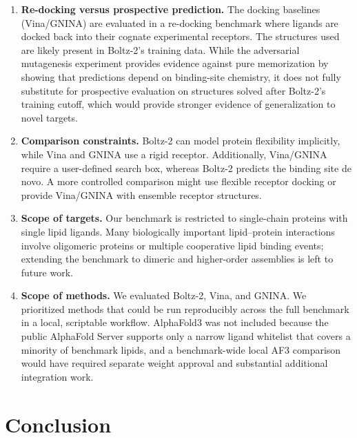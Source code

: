 \documentclass[journal=jcisd8,manuscript=article]{achemso}
\begin{document}
\begin{enumerate}
    \item \textbf{Re-docking versus prospective prediction.} The docking baselines (Vina/GNINA) are evaluated in a re-docking benchmark where ligands are docked back into their cognate experimental receptors. The structures used are likely present in Boltz-2's training data. While the adversarial mutagenesis experiment provides evidence against pure memorization by showing that predictions depend on binding-site chemistry, it does not fully substitute for prospective evaluation on structures solved after Boltz-2's training cutoff, which would provide stronger evidence of generalization to novel targets.

    \item \textbf{Comparison constraints.} Boltz-2 can model protein flexibility implicitly, while Vina and GNINA use a rigid receptor. Additionally, Vina/GNINA require a user-defined search box, whereas Boltz-2 predicts the binding site de novo. A more controlled comparison might use flexible receptor docking or provide Vina/GNINA with ensemble receptor structures.

    \item \textbf{Scope of targets.} Our benchmark is restricted to single-chain proteins with single lipid ligands. Many biologically important lipid--protein interactions involve oligomeric proteins or multiple cooperative lipid binding events; extending the benchmark to dimeric and higher-order assemblies is left to future work.

	    \item \textbf{Scope of methods.} We evaluated Boltz-2, Vina, and GNINA. We prioritized methods that could be run reproducibly across the full benchmark in a local, scriptable workflow. AlphaFold3 was not included because the public AlphaFold Server supports only a narrow ligand whitelist that covers a minority of benchmark lipids, and a benchmark-wide local AF3 comparison would have required separate weight approval and substantial additional integration work.

	\end{enumerate}

\section{Conclusion}
\end{document}
